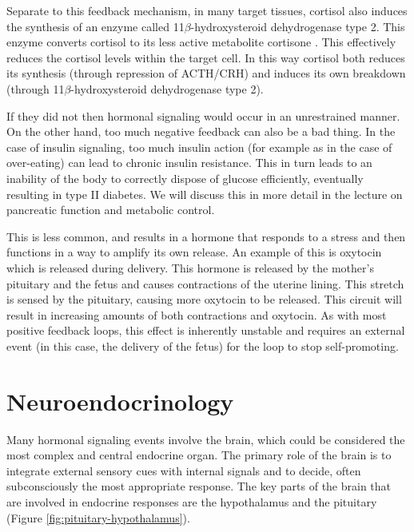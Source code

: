 \documentclass{tufte-handout}
\begin{document}
Separate to this feedback mechanism, in many target tissues, cortisol also induces the synthesis of an enzyme called 11$\beta$-hydroxysteroid dehydrogenase type 2.  This enzyme converts cortisol to its less active metabolite cortisone \cite{Hubener1956}.  This effectively reduces the cortisol levels within the target cell.  In this way cortisol both reduces its synthesis (through repression of ACTH/CRH) and induces its own breakdown (through 11$\beta$-hydroxysteroid dehydrogenase type 2).

  If they did not then hormonal signaling would occur in an unrestrained manner.  On the other hand, too much negative feedback can also be a bad thing.  In the case of insulin signaling, too much insulin action (for example as in the case of over-eating) can lead to chronic insulin resistance.  This in turn leads to an inability of the body to correctly dispose of glucose efficiently, eventually resulting in type II diabetes.  We will discuss this in more detail in the lecture on pancreatic function and metabolic control.

  This is less common, and results in a hormone that responds to a stress and then functions in a way to amplify its own release.  An example of this is oxytocin which is released during delivery.  This hormone is released by the mother's pituitary and the fetus and causes contractions of the uterine lining.  This stretch is sensed by the pituitary, causing more oxytocin to be released.  This circuit will result in increasing amounts of both contractions and oxytocin.  As with most positive feedback loops, this effect is inherently unstable and requires an external event (in this case, the delivery of the fetus) for the loop to stop self-promoting.

\section{Neuroendocrinology}

Many hormonal signaling events involve the brain, which could be considered the most complex and central endocrine organ.  The primary role of the brain is to integrate external sensory cues with internal signals and to decide, often subconsciously the most appropriate response.  The key parts of the brain that are involved in endocrine responses are the hypothalamus and the pituitary (Figure \ref{fig:pituitary-hypothalamus}).
\end{document}

